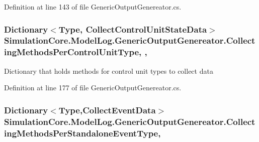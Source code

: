 Definition at line 143 of file Generic\+Output\+Genereator.\+cs.

\subsubsection[{\texorpdfstring{Collecting\+Methods\+Per\+Control\+Unit\+Type}{CollectingMethodsPerControlUnitType}}]{\setlength{\rightskip}{0pt plus 5cm}Dictionary$<$Type, {\bf Collect\+Control\+Unit\+State\+Data}$>$ Simulation\+Core.\+Model\+Log.\+Generic\+Output\+Genereator.\+Collecting\+Methods\+Per\+Control\+Unit\+Type\hspace{0.3cm}{\ttfamily [get]}, {\ttfamily [set]}, {\ttfamily [protected]}}\hypertarget{class_simulation_core_1_1_model_log_1_1_generic_output_genereator_ab6472739b209892ee71617fcb4631753}{}\label{class_simulation_core_1_1_model_log_1_1_generic_output_genereator_ab6472739b209892ee71617fcb4631753}


Dictionary that holds methods for control unit types to collect data 



Definition at line 177 of file Generic\+Output\+Genereator.\+cs.

\subsubsection[{\texorpdfstring{Collecting\+Methods\+Per\+Standalone\+Event\+Type}{CollectingMethodsPerStandaloneEventType}}]{\setlength{\rightskip}{0pt plus 5cm}Dictionary$<$Type,{\bf Collect\+Event\+Data}$>$ Simulation\+Core.\+Model\+Log.\+Generic\+Output\+Genereator.\+Collecting\+Methods\+Per\+Standalone\+Event\+Type\hspace{0.3cm}{\ttfamily [get]}, {\ttfamily [protected]}}\hypertarget{class_simulation_core_1_1_model_log_1_1_generic_output_genereator_af9dd2fe431d0d8f39cdd5f5c3a7fb73f}{}\label{class_simulation_core_1_1_model_log_1_1_generic_output_genereator_af9dd2fe431d0d8f39cdd5f5c3a7fb73f}


